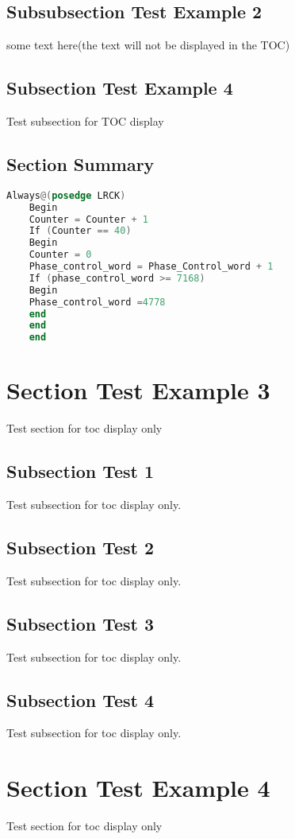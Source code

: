 \subsection*{Subsubsection Test Example 2}

some text here(the text will not be displayed in the TOC)


\subsection{Subsection Test Example 4}
Test subsection for TOC display

\subsection{Section Summary}
  
\begin{lstlisting}[language={Verilog},tabsize=5,title={A simple paragraph of Verilog code is below in verbatim}]
  Always@(posedge LRCK)
	Begin
	Counter = Counter + 1
	If (Counter == 40)
	Begin
	Counter = 0
	Phase_control_word = Phase_Control_word + 1
	If (phase_control_word >= 7168)
	Begin
	Phase_control_word =4778
	end
	end
	end
\end{lstlisting}

\section{Section Test Example 3}
Test section for toc display only

\subsection{Subsection Test 1}
Test subsection for toc display only.

\subsection{Subsection Test 2}
Test subsection for toc display only.

\subsection{Subsection Test 3}
Test subsection for toc display only.

\subsection{Subsection Test 4}
Test subsection for toc display only.

\section{Section Test Example 4}
Test section for toc display only






